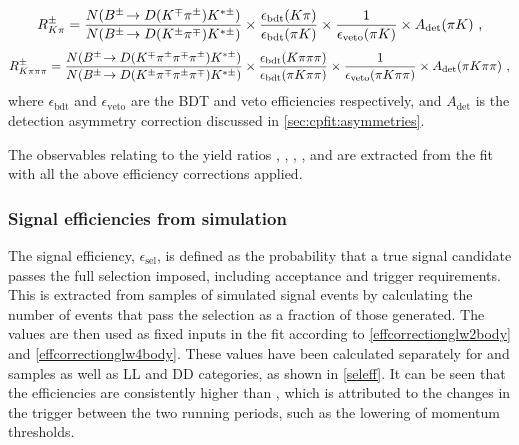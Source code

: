 {\footnotesize
\begin{equation}
R^{\pm}_{K\pi} = \frac{N({{B}^\pm}\!\rightarrow {\ensuremath{D}}({{K}^\mp}{{\pi}^\pm}){{K}^{*\pm}})}{N({{B}^\pm}\!\rightarrow {\ensuremath{D}}({{K}^\pm}{{\pi}^\mp}){{K}^{*\pm}})} \times \frac{\epsilon_{\text{bdt}}(K\pi)}{\epsilon_{\text{bdt}}(\pi K)} \times \frac{1}{\epsilon_{\text{veto}}(\pi K)} \times A_{\text{det}}(\pi K) \text{ ,}
\label{effcorrectionads2body}
\end{equation}
\begin{equation}
R^{\pm}_{K\pi\pi\pi} = \frac{N({{B}^\pm}\!\rightarrow {\ensuremath{D}}({{K}^\mp}{{\pi}^\pm}{{\pi}^\mp}{{\pi}^\pm}){{K}^{*\pm}})}{N({{B}^\pm}\!\rightarrow {\ensuremath{D}}({{K}^\pm}{{\pi}^\mp}{{\pi}^\pm}{{\pi}^\mp}){{K}^{*\pm}})} \times \frac{\epsilon_{\text{bdt}}(K\pi\pi\pi)}{\epsilon_{\text{bdt}}(\pi K\pi\pi)} \times \frac{1}{\epsilon_{\text{veto}}(\pi K\pi\pi)} \times A_{\text{det}}(\pi K\pi\pi) \text{ ,}
\label{effcorrectionads4body}
\end{equation}}
where $\epsilon_{\text{bdt}}$ and $\epsilon_{\text{veto}}$ are the BDT and veto efficiencies respectively, and $A_{\text{det}}$ is the detection asymmetry correction discussed in \sect\ref{sec:cpfit:asymmetries}.

The \CP observables relating to the yield ratios \Rkk, \Rpipi, \Rptwo,  \Rmtwo \Rpipipipi, \Rpfour and  \Rmfour are extracted from the \CP fit with all the above efficiency corrections applied.

\subsubsection{Signal efficiencies from simulation}
\label{sec:cpfit:efficiencies:signal}

The signal efficiency, $\epsilon_{\text{sel}}$, is defined as the probability that a true signal candidate passes the full selection imposed, including acceptance and trigger requirements. This is extracted from samples of simulated signal events by calculating the number of events that pass the selection as a fraction of those generated. The values are then used as fixed inputs in the \CP fit according to \eqns\ref{effcorrectionglw2body} and \ref{effcorrectionglw4body}. These values have been calculated separately for \runone and \runtwo samples as well as LL and DD categories, as shown in \tab\ref{seleff}. It can be seen that the \runtwo efficiencies are consistently higher than \runone, which is attributed to the changes in the trigger between the two running periods, such as the lowering of momentum thresholds.

